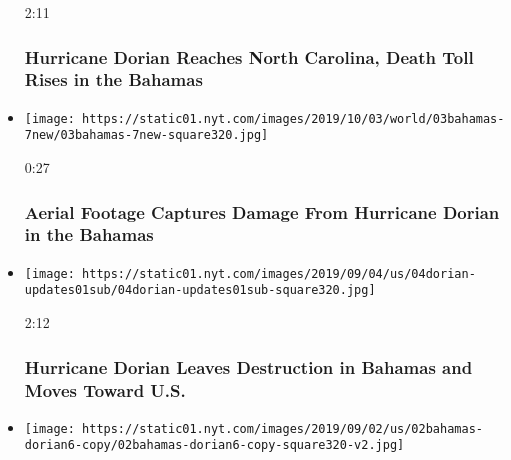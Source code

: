 \begin{itemize}
  2:11

  \hypertarget{hurricane-dorian-reaches-north-carolina-death-toll-rises-in-the-bahamas}{%
  \subsubsection{Hurricane Dorian Reaches North Carolina, Death Toll
  Rises in the
  Bahamas}\label{hurricane-dorian-reaches-north-carolina-death-toll-rises-in-the-bahamas}}
\item
  \href{https://www.nytimes.com/video/us/100000006695978/hurricane-dorian-bahamas-footage-destruction.html?action=click\&module=video-series-bar\&region=header\&pgtype=Article\&playlistId=video/extreme-weather}{}

  \texttt{[image: https://static01.nyt.com/images/2019/10/03/world/03bahamas-7new/03bahamas-7new-square320.jpg]}

  0:27

  \hypertarget{aerial-footage-captures-damage-from-hurricane-dorian-in-the-bahamas}{%
  \subsubsection{Aerial Footage Captures Damage From Hurricane Dorian in
  the
  Bahamas}\label{aerial-footage-captures-damage-from-hurricane-dorian-in-the-bahamas}}
\item
  \href{https://www.nytimes.com/video/us/100000006694578/hurricane-dorian-bahamas.html?action=click\&module=video-series-bar\&region=header\&pgtype=Article\&playlistId=video/extreme-weather}{}

  \texttt{[image: https://static01.nyt.com/images/2019/09/04/us/04dorian-updates01sub/04dorian-updates01sub-square320.jpg]}

  2:12

  \hypertarget{hurricane-dorian-leaves-destruction-in-bahamas-and-moves-toward-us}{%
  \subsubsection{Hurricane Dorian Leaves Destruction in Bahamas and
  Moves Toward
  U.S.}\label{hurricane-dorian-leaves-destruction-in-bahamas-and-moves-toward-us}}
\item
  \href{https://www.nytimes.com/video/us/100000006692573/hurricane-dorian-bahamas.html?action=click\&module=video-series-bar\&region=header\&pgtype=Article\&playlistId=video/extreme-weather}{}

  \texttt{[image: https://static01.nyt.com/images/2019/09/02/us/02bahamas-dorian6-copy/02bahamas-dorian6-copy-square320-v2.jpg]}


\end{itemize}

